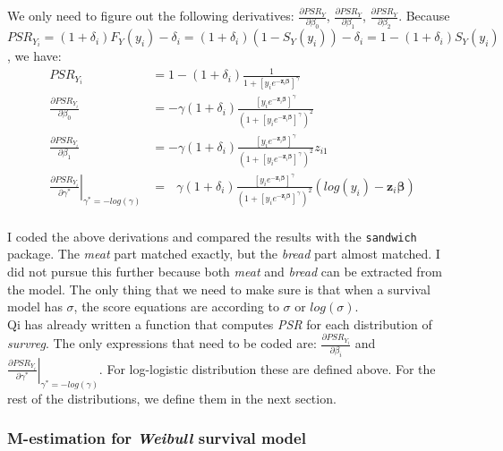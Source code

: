 \documentclass[]{article}
\begin{document}
We only need to figure out the following derivatives: $\frac{\partial PSR_Y}{\partial \beta_0}$, $\frac{\partial PSR_Y}{\partial \beta_1}$, $\frac{\partial PSR_Y}{\partial \beta_2}$. Because $PSR_{Y_i} = (1+\delta_i)F_Y(y_i) - \delta_i = (1+\delta_i)(1 - S_Y(y_i)) - \delta_i = 1 - (1+\delta_i)S_Y(y_i)$, we have:
  $$
  \begin{aligned}
    PSR_{Y_i} &=  1 - (1+\delta_i) \frac{1}{1+\left[y_i e^{-\pmb{z}_i\pmb{\beta}}\right]^{ \gamma}} \\
    \frac{\partial PSR_{Y_i}}{\partial \beta_0} &= - \gamma(1+\delta_i) \frac{  \left[y_i e^{-\pmb{z}_i\pmb{\beta}}    \right]^{ \gamma}  }{    \left(1+\left[y_i e^{-\pmb{z}_i\pmb{\beta}}    \right]^{ \gamma}\right)^2} \\
    \frac{\partial PSR_{Y_i}}{\partial \beta_1} &= - \gamma(1+\delta_i) \frac{  \left[y_i e^{-\pmb{z}_i\pmb{\beta}}    \right]^{ \gamma}  }{    \left(1+\left[y_i e^{-\pmb{z}_i\pmb{\beta}}    \right]^{ \gamma}\right)^2}  z_{i1}\\
    \left. \frac{\partial PSR_{Y_i}}{\partial \gamma^*} \right|_{\gamma^* = -log(\gamma)} &= ~~~ \gamma(1+\delta_i)\frac{    \left[y_i e^{-\pmb{z}_i\pmb{\beta}}    \right]^{ \gamma}  }{    \left(1+\left[y_i e^{-\pmb{z}_i\pmb{\beta}}    \right]^{ \gamma}\right)^2}(log(y_i) - \pmb{z}_i\pmb{\beta}) \\
  \end{aligned}
  $$

I coded the above derivations and compared the results with the \texttt{sandwich} package. The \emph{meat} part matched exactly, but the \emph{bread} part almost matched. I did not pursue this further because both \emph{meat} and \emph{bread} can be extracted from the model. The only thing that we need to make sure is that when a survival model has $\sigma$,  the score equations are according to $\sigma$ or $log(\sigma)$.\\
Qi has already written a function that computes \emph{PSR} for each distribution of \emph{survreg}. The only expressions that need to be coded are:  $\frac{\partial PSR_{Y_i}}{\partial \beta_i}$ and $\left. \frac{\partial PSR_{Y_i}}{\partial \gamma^*} \right|_{\gamma^* = -log(\gamma)}$. For log-logistic distribution these are defined above. For the rest of the distributions, we define them in the next section.

\subsubsection{M-estimation for \emph{Weibull} survival model}
\end{document}
